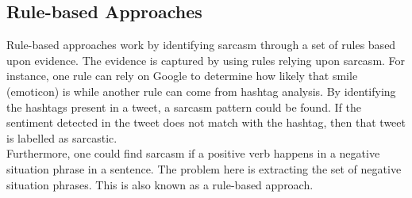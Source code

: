 \subsection{Rule-based Approaches~\cite{joshi2017automatic}}
Rule-based approaches work by identifying sarcasm through a set of rules based upon evidence. The evidence is captured by using rules relying upon sarcasm. For instance, one rule can rely on Google to determine how likely that smile (emoticon) is while another rule can come from hashtag analysis. By identifying the hashtags present in a tweet, a sarcasm pattern could be found. If the sentiment detected in the tweet does not match with the hashtag, then that tweet is labelled as sarcastic.\\ Furthermore, one could find sarcasm if a positive verb happens in a negative situation phrase in a sentence. The problem here is extracting the set of negative situation phrases. This is also known as a rule-based approach.
